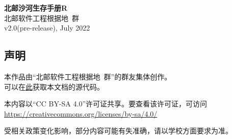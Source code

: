 \documentclass[a4paper]{article}
\begin{document}


\begin{titlepage}
    \centering
    {\Huge\rmfamily\bfseries 北邮沙河生存手册R} \\[6.5ex]
    {\Large\sffamily 北邮软件工程根据地\ 群} \\
    {\large\sffamily v2.0(pre-release), July 2022}\\[1.5ex]
\end{titlepage}

\begin{titlepage}
    \centering
    \section*{声明}

    本作品由“北邮软件工程根据地\ 群”的群友集体创作。\\
    可以在\href{https://github.com/BUPTSE/welcome}{此}获取本文档的源代码。

    \smallskip

    本内容以“CC BY-SA 4.0”许可证共享。要查看该许可证，可访问\\
    \href{https://creativecommons.org/licenses/by-sa/4.0/}{https://creativecommons.org/licenses/by-sa/4.0/}

    \smallskip

    受相关政策变化影响，部分内容可能有失准确，请以学校方面要求为准。

    \bigskip
    \tableofcontents
\end{titlepage}

\pagestyle{fancy}
\lhead{\small \leftmark}
\chead{}
\lfoot{}
\cfoot{\thepage}
\rfoot{}
\renewcommand{\headrulewidth}{0.4pt}



\newpage


\newpage


\newpage


\newpage


\newpage


\newpage


\newpage


\newpage


\newpage


\end{document}
